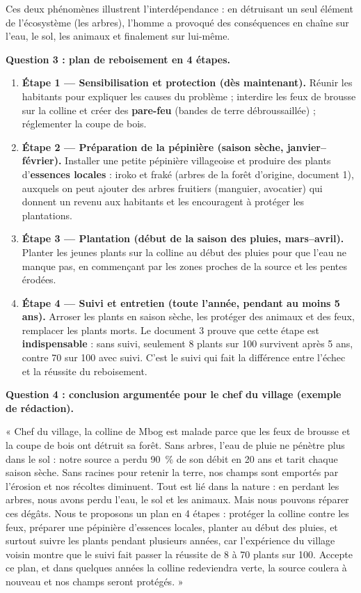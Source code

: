 \documentclass[11pt]{article}
\newcommand{\cle}[1]{{\popxbold\color{popdark}#1}}
\begin{document}
\begin{exoresolu}
Ces deux phénomènes illustrent l'\cle{interdépendance} : en détruisant un seul élément de l'écosystème (les arbres), l'homme a provoqué des conséquences en chaîne sur l'eau, le sol, les animaux et finalement sur lui-même.

\textbf{Question 3 : plan de reboisement en 4 étapes.}

\begin{enumerate}
\item \textbf{Étape 1 — Sensibilisation et protection (dès maintenant).} Réunir les habitants pour expliquer les causes du problème ; interdire les feux de brousse sur la colline et créer des \textbf{pare-feu} (bandes de terre débroussaillée) ; réglementer la coupe de bois.
\item \textbf{Étape 2 — Préparation de la pépinière (saison sèche, janvier--février).} Installer une petite pépinière villageoise et produire des plants d'\textbf{essences locales} : iroko et fraké (arbres de la forêt d'origine, document 1), auxquels on peut ajouter des arbres fruitiers (manguier, avocatier) qui donnent un revenu aux habitants et les encouragent à protéger les plantations.
\item \textbf{Étape 3 — Plantation (début de la saison des pluies, mars--avril).} Planter les jeunes plants sur la colline au début des pluies pour que l'eau ne manque pas, en commençant par les zones proches de la source et les pentes érodées.
\item \textbf{Étape 4 — Suivi et entretien (toute l'année, pendant au moins 5 ans).} Arroser les plants en saison sèche, les protéger des animaux et des feux, remplacer les plants morts. Le document 3 prouve que cette étape est \textbf{indispensable} : sans suivi, seulement 8 plants sur 100 survivent après 5 ans, contre 70 sur 100 avec suivi. C'est le suivi qui fait la différence entre l'échec et la réussite du reboisement.
\end{enumerate}

\textbf{Question 4 : conclusion argumentée pour le chef du village (exemple de rédaction).}

« Chef du village, la colline de Mbog est malade parce que les feux de brousse et la coupe de bois ont détruit sa forêt. Sans arbres, l'eau de pluie ne pénètre plus dans le sol : notre source a perdu 90~\% de son débit en 20 ans et tarit chaque saison sèche. Sans racines pour retenir la terre, nos champs sont emportés par l'érosion et nos récoltes diminuent. Tout est lié dans la nature : en perdant les arbres, nous avons perdu l'eau, le sol et les animaux. Mais nous pouvons réparer ces dégâts. Nous te proposons un plan en 4 étapes : protéger la colline contre les feux, préparer une pépinière d'essences locales, planter au début des pluies, et surtout suivre les plants pendant plusieurs années, car l'expérience du village voisin montre que le suivi fait passer la réussite de 8 à 70 plants sur 100. Accepte ce plan, et dans quelques années la colline redeviendra verte, la source coulera à nouveau et nos champs seront protégés. »
\end{exoresolu}
\end{document}
